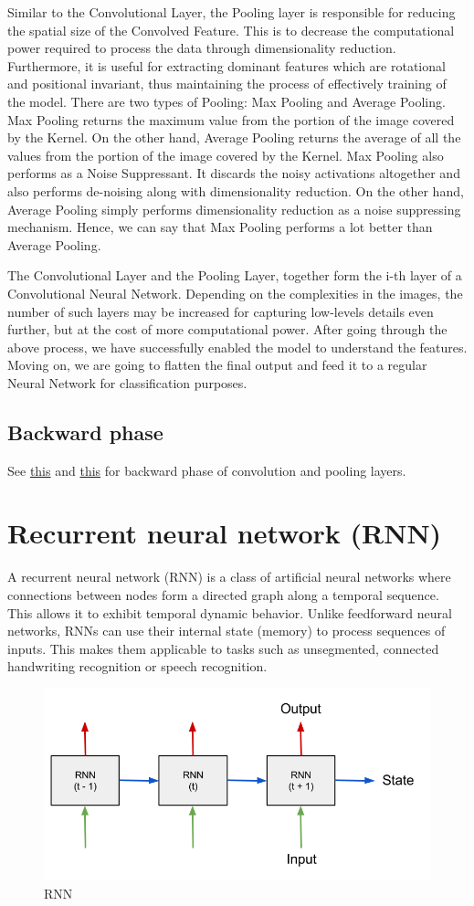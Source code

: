 \documentclass[10pt]{SelfArx} %
\begin{document}
Similar to the Convolutional Layer, the Pooling layer is responsible for reducing the spatial size of the Convolved Feature. This is to decrease the computational power required to process the data through dimensionality reduction. Furthermore, it is useful for extracting dominant features which are rotational and positional invariant, thus maintaining the process of effectively training of the model.
There are two types of Pooling: Max Pooling and Average Pooling. Max Pooling returns the maximum value from the portion of the image covered by the Kernel. On the other hand, Average Pooling returns the average of all the values from the portion of the image covered by the Kernel.
Max Pooling also performs as a Noise Suppressant. It discards the noisy activations altogether and also performs de-noising along with dimensionality reduction. On the other hand, Average Pooling simply performs dimensionality reduction as a noise suppressing mechanism. Hence, we can say that Max Pooling performs a lot better than Average Pooling.

The Convolutional Layer and the Pooling Layer, together form the i-th layer of a Convolutional Neural Network. Depending on the complexities in the images, the number of such layers may be increased for capturing low-levels details even further, but at the cost of more computational power.
After going through the above process, we have successfully enabled the model to understand the features. Moving on, we are going to flatten the final output and feed it to a regular Neural Network for classification purposes.
\subsection{Backward phase}
See \href{https://medium.com/@2017csm1006/forward-and-backpropagation-in-convolutional-neural-network-4dfa96d7b37e}{this} and \href{https://becominghuman.ai/back-propagation-in-convolutional-neural-networks-intuition-and-code-714ef1c38199}{this} for backward phase of convolution and pooling layers.

\section{Recurrent neural network (RNN)}
A recurrent neural network (RNN) is a class of artificial neural networks where connections between nodes form a directed graph along a temporal sequence. This allows it to exhibit temporal dynamic behavior. Unlike feedforward neural networks, RNNs can use their internal state (memory) to process sequences of inputs. This makes them applicable to tasks such as unsegmented, connected handwriting recognition or speech recognition.
\begin{figure}\centering 
	\includegraphics[width=.6\linewidth]{img/rnn}
	\caption{RNN}
\end{figure}
\end{document}
